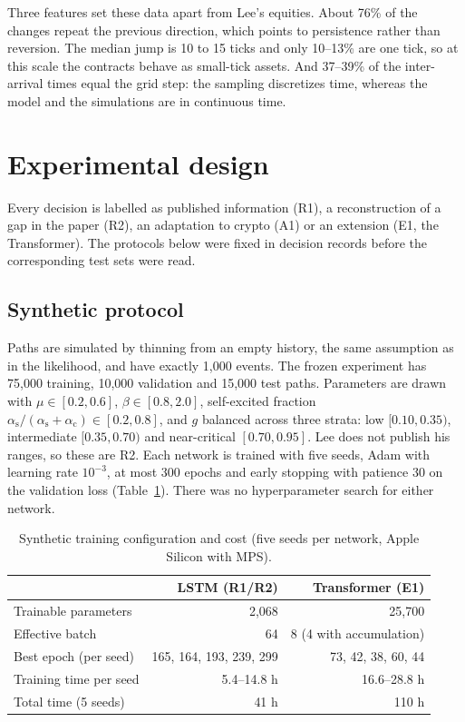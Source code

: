 \documentclass[preprint,12pt,authoryear]{elsarticle}
\newcommand{\aself}{\alpha_{\mathrm{s}}}
\newcommand{\across}{\alpha_{\mathrm{c}}}
\begin{document}
Three features set these data apart from Lee's equities. About 76\% of the changes repeat
the previous direction, which points to persistence rather than reversion. The median jump
is 10 to 15 ticks and only 10--13\% are one tick, so at this scale the contracts behave as
small-tick assets. And 37--39\% of the inter-arrival times equal the grid step: the
sampling discretizes time, whereas the model and the simulations are in continuous time.

\section{Experimental design}
\label{sec:design}

Every decision is labelled as published information (R1), a reconstruction of a gap in the
paper (R2), an adaptation to crypto (A1) or an extension (E1, the Transformer). The
protocols below were fixed in decision records before the corresponding test sets were read.

\subsection{Synthetic protocol}

Paths are simulated by thinning \citep{ogata1981} from an empty history, the same
assumption as in the likelihood, and have exactly 1,000 events. The frozen experiment has
75,000 training, 10,000 validation and 15,000 test paths. Parameters are drawn with
$\mu\in[0.2,0.6]$, $\beta\in[0.8,2.0]$, self-excited fraction $\aself/(\aself+\across)
\in[0.2,0.8]$, and $g$ balanced across three strata: low $[0.10,0.35)$, intermediate
$[0.35,0.70)$ and near-critical $[0.70,0.95]$. Lee does not publish his ranges, so these are
R2. Each network is trained with five seeds, Adam with learning rate $10^{-3}$, at most 300
epochs and early stopping with patience 30 on the validation loss (Table~\ref{tab:training}).
There was no hyperparameter search for either network.

\begin{table}[t]
\centering
\caption{Synthetic training configuration and cost (five seeds per network, Apple Silicon
with MPS).}
\label{tab:training}
\small
\begin{tabular}{lrr}
\toprule
 & LSTM (R1/R2) & Transformer (E1)\\
\midrule
Trainable parameters & 2,068 & 25,700\\
Effective batch & 64 & 8 (4 with accumulation)\\
Best epoch (per seed) & 165, 164, 193, 239, 299 & 73, 42, 38, 60, 44\\
Training time per seed & 5.4--14.8 h & 16.6--28.8 h\\
Total time (5 seeds) & 41 h & 110 h\\
\bottomrule
\end{tabular}
\end{table}
\end{document}
